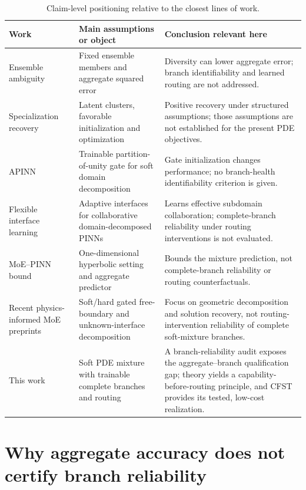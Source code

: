 \documentclass[preprint,12pt]{elsarticle}
\theoremstyle{remark}
\begin{document}
\begin{table}[H]
\centering\scriptsize
\caption{Claim-level positioning relative to the closest lines of work.}
\label{tab:positioning}
\begin{tabularx}{\linewidth}{@{}p{2.3cm}p{3.2cm}X@{}}
\toprule
Work & Main assumptions or object & Conclusion relevant here\\
\midrule
Ensemble ambiguity \cite{krogh1995} & Fixed ensemble members and aggregate squared error & Diversity can lower aggregate error; branch identifiability and learned routing are not addressed.\\
Specialization recovery \cite{chen2022moe} & Latent clusters, favorable initialization and optimization & Positive recovery under structured assumptions; those assumptions are not established for the present PDE objectives.\\
APINN \cite{hu2023} & Trainable partition-of-unity gate for soft domain decomposition & Gate initialization changes performance; no branch-health identifiability criterion is given.\\
Flexible interface learning \cite{li2026flexible} & Adaptive interfaces for collaborative domain-decomposed PINNs & Learns effective subdomain collaboration; complete-branch reliability under routing interventions is not evaluated.\\
MoE--PINN bound \cite{dan2025moepinn} & One-dimensional hyperbolic setting and aggregate predictor & Bounds the mixture prediction, not complete-branch reliability or routing counterfactuals.\\
Recent physics-informed MoE preprints \cite{barkhudaryan2026dmoe,peng2026pimoe} & Soft/hard gated free-boundary and unknown-interface decomposition & Focus on geometric decomposition and solution recovery, not routing-intervention reliability of complete soft-mixture branches.\\
This work & Soft PDE mixture with trainable complete branches and routing & A branch-reliability audit exposes the aggregate--branch qualification gap; theory yields a capability-before-routing principle, and CFST provides its tested, low-cost realization.\\
\bottomrule
\end{tabularx}
\end{table}

\section{Why aggregate accuracy does not certify branch reliability}
\end{document}
